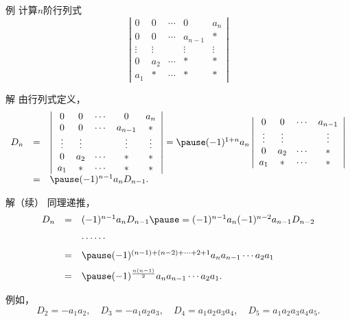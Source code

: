 \begin{frame}
  \begin{exampleblock}{例}
    计算$n$阶行列式
    $$
    \left|
    \begin{array}{ccccc}
      0  &  0 & \cdots & 0 & a_n \\
      0  &  0 & \cdots & a_{n-1} & * \\
      \vdots & \vdots & & \vdots & \vdots\\  
      0  &  a_2 & \cdots & * & * \\
      a_1 & * & \cdots & * & *
    \end{array}
    \right| 
    $$
  \end{exampleblock} \pause 

  \begin{block}{解}
    由行列式定义，
    $$
    \begin{array}{rcl}
      D_n &=& \left|
      \begin{array}{ccccc}
        0  &  0 & \cdots & 0 & a_n \\
        0  &  0 & \cdots & a_{n-1} & * \\
        \vdots & \vdots & & \vdots & \vdots\\  
        0  &  a_2 & \cdots & * & * \\
        a_1 & * & \cdots & * & *
      \end{array}
      \right| = \pause  (-1)^{1+n} a_n \left|
      \begin{array}{cccc}
        0  &  0 & \cdots &   a_{n-1} \\
        \vdots & \vdots &  & \vdots\\  
        0  &  a_2 & \cdots  & * \\
        a_1 & * & \cdots  & *
      \end{array} 
      \right| \\
      &=& \pause (-1)^{n-1} a_n D_{n-1}.      
    \end{array}
    $$
  \end{block}

\end{frame}


\begin{frame}
  \begin{block}{解（续）}
    同理递推，
    $$
    \begin{array}{rcl}
      D_n & =& (-1)^{n-1} a_n D_{n-1} \pause = (-1)^{n-1} a_n (-1)^{n-2} a_{n-1} D_{n-2} \\[0.1in]
      && \cdots\cdots \\[0.2cm]
      &=& \pause  (-1)^{(n-1)+(n-2)+\cdots+2+1} a_n a_{n-1} \cdots a_2 a_1 \\[0.1in]
      &=& \pause (-1)^{\frac{n(n-1)}{2}} a_n a_{n-1} \cdots a_2 a_1.
    \end{array}
    $$

  \end{block}

  \pause 
  例如，
  $$
  D_2 = -a_1a_2, \quad
  D_3 = -a_1a_2a_3, \quad
  D_4 = a_1a_2a_3a_4, \quad
  D_5 = a_1a_2a_3a_4a_5.
  $$

\end{frame}
